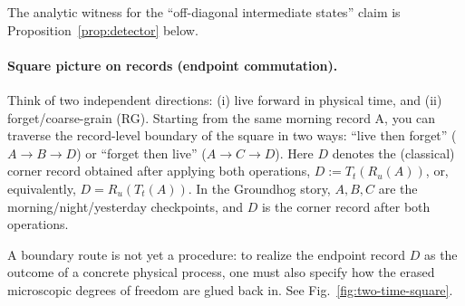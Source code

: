 \documentclass[aps,prl,reprint,floatfix]{revtex4-2}
\theoremstyle{plain}
\theoremstyle{definition}
\begin{document}
The analytic witness for the “off-diagonal intermediate states” claim is Proposition~\ref{prop:detector} below.
\paragraph{Square picture on records (endpoint commutation).}
Think of two independent directions: (i) live forward in physical time, and (ii) forget/coarse-grain (RG).
Starting from the same morning record A, you can traverse the record-level boundary of the square in two ways:
“live then forget” ($A\to B \to D$) or “forget then live” ($A \to C \to D$).
Here $D$ denotes the (classical) corner record obtained after applying both operations,
$D:=T_t(R_u(A))$, or, equivalently, $D=R_u(T_t(A))$.
In the Groundhog story, $A,B,C$ are the morning/night/yesterday checkpoints, and $D$ is the corner record after both operations.

\smallskip
A boundary route is not yet a procedure: to realize the endpoint record $D$ as the outcome of a concrete physical process, one must also specify
how the erased microscopic degrees of freedom are glued back in.
See Fig.~\ref{fig:two-time-square}.
\end{document}
